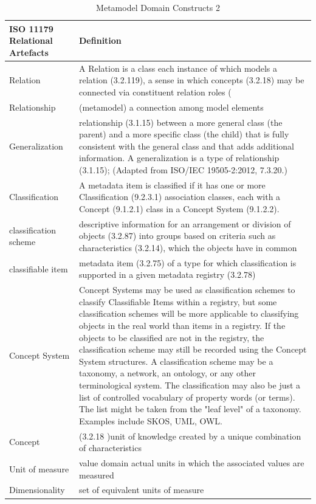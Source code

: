 \documentclass{article}
\begin{document}
\begin{table}[h]
	\begin{center}
		\caption{Metamodel Domain Constructs 2}
		\label{tab:metamodelconstructs2}
		\begin{tabular}{ p{6cm} | p{8cm}  } 
			\textbf{ISO 11179 Relational Artefacts} & \textbf{Definition} \\
			\hline
			Relation  &  A Relation is a class each instance of which models a relation (3.2.119), a sense in which concepts (3.2.18) may be connected via constituent relation roles (\\
			\hline
			Relationship & (metamodel) a connection among model elements    \\
			\hline
			Generalization & relationship (3.1.15) between a more general class (the parent) and a more specific class (the child) that is fully consistent with the general class and that adds additional information. A generalization is a type of relationship (3.1.15);
			(Adapted from ISO/IEC 19505-2:2012, 7.3.20.)\\
			\hline
			Classification & A metadata item is classified if it has one or more Classification (9.2.3.1) association classes, each with a Concept (9.1.2.1) class in a Concept System (9.1.2.2).\\
			\hline
			classification scheme &  descriptive information for an arrangement or division of objects (3.2.87) into groups based on criteria such as characteristics (3.2.14), which the objects have in common \\
			\hline
			classifiable item & metadata item (3.2.75) of a type for which classification is supported in a given metadata registry (3.2.78)\\
			\hline
			Concept System &  Concept Systems may be used as classification schemes to classify Classifiable Items within a registry, but some classification schemes will be more applicable to classifying objects in the real world than items in a registry. If the objects to be classified are not in the registry, the classification scheme may still be recorded using the Concept System structures.
			A classification scheme may be a taxonomy, a network, an ontology, or any other terminological system. The classification may also be just a list of controlled vocabulary of property words (or terms). The list might be taken from the "leaf level" of a taxonomy. Examples include SKOS, UML, OWL.   \\
			\hline
			Concept &  (3.2.18 )unit of knowledge created by a unique combination of characteristics   \\
			\hline
			Unit of measure & value domain actual units in which the associated values are measured \\
			\hline
			Dimensionality &  set of equivalent units of measure   \\
			\hline
		\end{tabular}
	\end{center}
\end{table}
	\FloatBarrier
\end{document}
